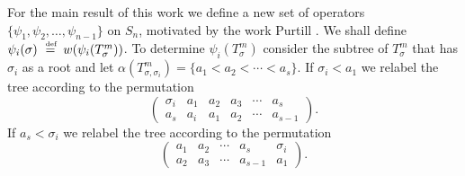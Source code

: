 For the main result of this work we define a new set  of
operators $\{ \psi_1, \psi_2, \ldots, \psi_{n-1} \}$ on $S_n$, motivated
by the work Purtill \cite{pur}. We shall define 
$\psi_i(\sigma)\stackrel{\mbox{\rm\tiny\, def }}{=} w(\psi_i(T_\sigma^m))$.
To determine  $\psi_i(T_\sigma^m)$ consider the subtree
 of $T_\sigma^m$ that has $\sigma_i$ as a root and let 
$\alpha(T^m_{\sigma,\sigma_i}) = \{ a_1 < a_2 < \cdots < a_s \}$.  
If $\sigma_i < a_1$  we
relabel the tree according to the permutation
$$
\left(
\begin{array}{cccccl}
\sigma_i & a_1 &  a_2  & a_3    & \cdots & a_s   \\
a_s      & a_i &  a_1  & a_2    & \cdots & a_{s-1}
\end{array}\right).
$$
If $a_s < \sigma_i$  we
relabel the tree according to the permutation
$$
\left(
\begin{array}{ccclc}
a_1 &  a_2        & \cdots & a_s       & \sigma_i \\
a_2 &  a_3        & \cdots & a_{s-1}   & a_1
\end{array}\right).
$$

